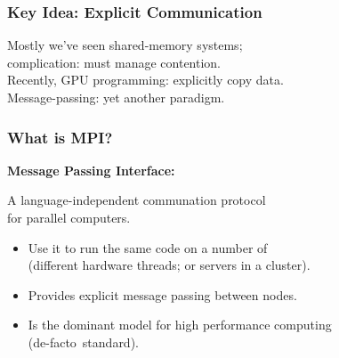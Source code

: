 \begin{frame}
  \frametitle{Key Idea: Explicit Communication}

  
  Mostly we've seen shared-memory systems;\\
  \qquad complication: must manage contention.\\[1em]

  Recently, GPU programming: explicitly copy data.\\[1em]

  Message-passing: yet another paradigm.

  
\end{frame}

\begin{frame}
  \frametitle{What is MPI?}



  {\bf Message Passing Interface:}

  A language-independent communation protocol\\ for parallel computers.

  \begin{itemize}
    \item Use it to run the same code on a number of \\ \qquad (different hardware
      threads; or servers in a cluster).
    \item Provides explicit message passing between nodes.
    \item Is the dominant model for high performance computing\\ \qquad (de-facto~standard).
  \end{itemize}
  
\end{frame}

